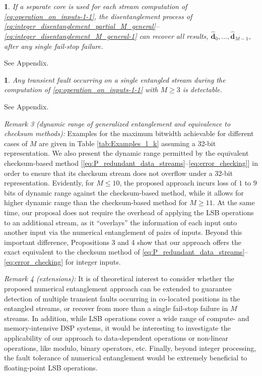 \documentclass[twocolumn,english,onecolumn]{IEEEtran}
\theoremstyle{plain}
\theoremstyle{plain}
\newtheorem{prop}[thm]{\protect\propositionname}
\providecommand{\propositionname}{Proposition}
\begin{document}
\begin{prop}
If a separate core is used for each stream computation of \eqref{eq:operation_on_inputs-1-1},
the disentanglement process of \eqref{eq:integer_disentanglement_partial_M_general}--\eqref{eq:integer_disentanglement_M_general-1}
can recover all results, $\mathbf{\hat{d}}_{0},\ldots,\mathbf{\hat{d}}_{M-1}$,
after any single fail-stop failure.\end{prop}
\begin{IEEEproof}
See Appendix. \end{IEEEproof}
\begin{prop}
Any transient fault occurring on a single entangled stream during
the computation of \eqref{eq:operation_on_inputs-1-1} with $M\geq3$
is detectable. \end{prop}
\begin{IEEEproof}
See Appendix.
\end{IEEEproof}
\emph{Remark 3 (dynamic range of generalized entanglement and equivalence
to checksum methods):} Examples for the maximum bitwidth achievable
for different cases of $M$ are given in Table \ref{tab:Examples_l_k}
assuming a 32-bit representation. We also present the dynamic range
permitted by the equivalent checksum-based method {[}\eqref{eq:P_redundant_data_streams}--\eqref{eq:error_checking}{]}
in order to ensure that its checksum stream does not overflow under
a 32-bit representation. Evidently, for $M\leq10$, the proposed approach
incurs loss of $1$ to $9$ bits of dynamic range against the checksum-based
method, while it allows for higher dynamic range than the checksum-based
method for $M\geq11$. At the same time, our proposal does not require
the overhead of applying the LSB operations to an additional stream,
as it ``overlays'' the information of each input onto another input
via the numerical entanglement of pairs of inputs. Beyond this important
difference, Propositions 3 and 4 show that our approach offers the
exact equivalent to the checksum method of \eqref{eq:P_redundant_data_streams}--\eqref{eq:error_checking}
for integer inputs.

\emph{Remark 4 (extensions):} It is of theoretical interest to consider
whether the proposed numerical entanglement approach can be extended
to guarantee detection of multiple transient faults occurring in co-located
positions in the entangled streams, or recover from more than a single
fail-stop failure in $M$ streams. In addition, while LSB operations
cover a wide range of compute- and memory-intensive DSP systems, it
would be interesting to investigate the applicability of our approach
to data-dependent operations or non-linear operations, like modulo,
binary operators, etc. Finally, beyond integer processing, the fault
tolerance of numerical entanglement would be extremely beneficial
to floating-point LSB operations. 
\end{document}
